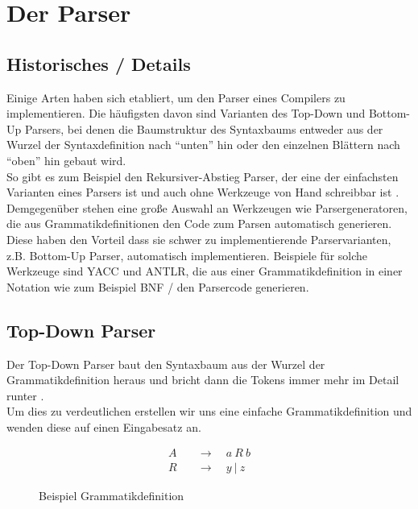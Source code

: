 \chapter{Der Parser}
\label{chap:theory:parser}

\section{Historisches / Details}

Einige Arten haben sich etabliert, um den Parser eines Compilers zu implementieren.
Die häufigsten davon sind Varianten des Top-Down und Bottom-Up Parsers, bei denen die Baumstruktur des Syntaxbaums entweder aus der Wurzel der Syntaxdefinition nach ``unten'' hin oder den einzelnen Blättern nach ``oben'' hin gebaut wird.\\
So gibt es zum Beispiel den Rekursiver-Abstieg Parser, der eine der einfachsten Varianten eines Parsers ist und auch ohne Werkzeuge von Hand schreibbar ist \cite{mossenbock:2024}.
Demgegenüber stehen eine große Auswahl an Werkzeugen wie Parsergeneratoren, die aus Grammatikdefinitionen den Code zum Parsen automatisch generieren.
Diese haben den Vorteil dass sie schwer zu implementierende Parservarianten, z.B. Bottom-Up Parser, automatisch implementieren.
Beispiele für solche Werkzeuge sind YACC und ANTLR, die aus einer Grammatikdefinition in einer Notation wie zum Beispiel BNF /  den Parsercode generieren.

\section{Top-Down Parser}

Der Top-Down Parser baut den Syntaxbaum aus der Wurzel der Grammatikdefinition heraus und bricht dann die Tokens immer mehr im Detail runter \cite{meduna2007elements}.\\
Um dies zu verdeutlichen erstellen wir uns eine einfache Grammatikdefinition und wenden diese auf einen Eingabesatz an.\\
\begin{figure}[H]
  \begin{align*}
    A &\quad\rightarrow\quad a\ R\ b \\
    R &\quad\rightarrow\quad y\ |\ z
  \end{align*}
  \caption{Beispiel Grammatikdefinition}
  \label{fig:theory:parser:topdown:grammar}
\end{figure}

